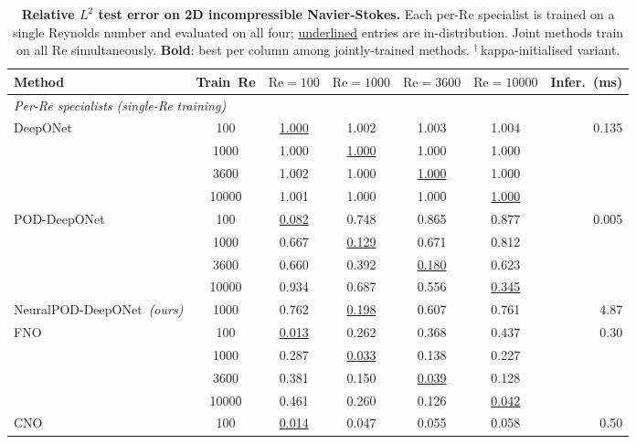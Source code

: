 \documentclass[preprint,10pt]{elsarticle}
\begin{document}
\begin{table}[!htbp]
\centering
\footnotesize
\setlength{\tabcolsep}{3pt}
\caption{\textbf{Relative $L^2$ test error on 2D incompressible Navier-Stokes.}
  Each per-Re specialist is trained on a single Reynolds number and evaluated on
  all four; \underline{underlined} entries are in-distribution.
  Joint methods train on all Re simultaneously.
  \textbf{Bold}: best per column among jointly-trained methods.
  $^\dagger$\,kappa-initialised variant.}
\label{tab:ns}
\begin{tabular}{l c c c c c r}
\toprule
Method & Train~Re
  & $\mathrm{Re}{=}100$ & $\mathrm{Re}{=}1000$ & $\mathrm{Re}{=}3600$ & $\mathrm{Re}{=}10000$
  & Infer.~(ms) \\
\midrule
\multicolumn{7}{l}{\textit{Per-Re specialists (single-Re training)}} \\[2pt]
\multirow{4}{*}{DeepONet~\cite{Lu2019}}
  & 100   & \underline{1.000} & 1.002 & 1.003 & 1.004 & \multirow{4}{*}{0.135} \\
  & 1000  & 1.000 & \underline{1.000} & 1.000 & 1.000 & \\
  & 3600  & 1.002 & 1.000 & \underline{1.000} & 1.000 & \\
  & 10000 & 1.001 & 1.000 & 1.000 & \underline{1.000} & \\[4pt]
\multirow{4}{*}{POD-DeepONet~\cite{Lu2022}}
  & 100   & \underline{0.082} & 0.748 & 0.865 & 0.877 & \multirow{4}{*}{0.005} \\
  & 1000  & 0.667 & \underline{0.129} & 0.671 & 0.812 & \\
  & 3600  & 0.660 & 0.392 & \underline{0.180} & 0.623 & \\
  & 10000 & 0.934 & 0.687 & 0.556 & \underline{0.345} & \\[4pt]
NeuralPOD-DeepONet~\textit{(ours)}
  & 1000  & 0.762 & \underline{0.198} & 0.607 & 0.761 & 4.87 \\[4pt]
\multirow{4}{*}{FNO~\cite{Li2021}}
  & 100   & \underline{0.013} & 0.262 & 0.368 & 0.437 & \multirow{4}{*}{0.30} \\
  & 1000  & 0.287 & \underline{0.033} & 0.138 & 0.227 & \\
  & 3600  & 0.381 & 0.150 & \underline{0.039} & 0.128 & \\
  & 10000 & 0.461 & 0.260 & 0.126 & \underline{0.042} & \\[4pt]
\multirow{4}{*}{CNO~\cite{Raonic2023}}
  & 100   & \underline{0.014} & 0.047 & 0.055 & 0.058 & \multirow{4}{*}{0.50} \\

\end{tabular}
\end{table}
\end{document}
